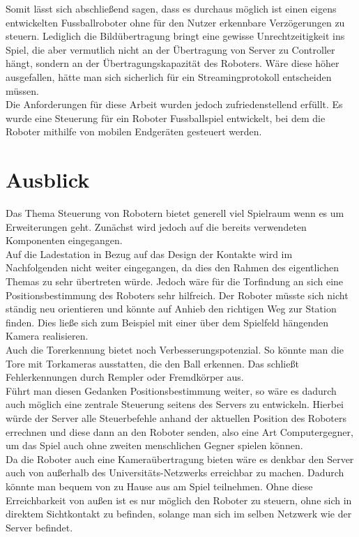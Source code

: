 Somit lässt sich abschließend sagen, dass es durchaus möglich ist einen eigens entwickelten Fussballroboter ohne für den Nutzer erkennbare Verzögerungen zu steuern. Lediglich die Bildübertragung bringt eine gewisse Unrechtzeitigkeit ins Spiel, die aber vermutlich nicht an der Übertragung von Server zu Controller hängt, sondern an der Übertragungskapazität des Roboters. Wäre diese höher ausgefallen, hätte man sich sicherlich für ein Streamingprotokoll entscheiden müssen.\\
Die Anforderungen für diese Arbeit wurden jedoch zufriedenstellend erfüllt. Es wurde eine Steuerung für ein Roboter Fussballspiel entwickelt, bei dem die Roboter mithilfe von mobilen Endgeräten gesteuert werden.





\section{Ausblick}

Das Thema Steuerung von Robotern bietet generell viel Spielraum wenn es um Erweiterungen geht. Zunächst wird jedoch auf die bereits verwendeten Komponenten eingegangen.\\
Auf die Ladestation in Bezug auf das Design der Kontakte wird im Nachfolgenden nicht weiter eingegangen, da dies den Rahmen des eigentlichen Themas zu sehr übertreten würde. Jedoch wäre für die Torfindung an sich eine Positionsbestimmung des Roboters sehr hilfreich. Der Roboter müsste sich nicht ständig neu orientieren und könnte auf Anhieb den richtigen Weg zur Station finden. Dies ließe sich zum Beispiel mit einer über dem Spielfeld hängenden Kamera realisieren.  \\
Auch die Torerkennung bietet noch Verbesserungspotenzial. So könnte man die Tore mit Torkameras ausstatten, die den Ball erkennen. Das schließt Fehlerkennungen durch Rempler oder Fremdkörper aus. \\

Führt man diesen Gedanken Positionsbestimmung weiter, so wäre es dadurch auch möglich eine zentrale Steuerung seitens des Servers zu entwickeln. Hierbei würde der Server alle Steuerbefehle anhand der aktuellen Position des Roboters errechnen und diese dann an den Roboter senden, also eine Art Computergegner, um das Spiel auch ohne zweiten menschlichen Gegner spielen können. \\
Da die Roboter auch eine Kameraübertragung bieten wäre es denkbar den Server auch von außerhalb des Universitäts-Netzwerks erreichbar zu machen. Dadurch könnte man bequem von zu Hause aus am Spiel teilnehmen. Ohne diese Erreichbarkeit von außen ist es nur möglich den Roboter zu steuern, ohne sich in direktem Sichtkontakt zu befinden, solange man sich im selben Netzwerk wie der Server befindet.